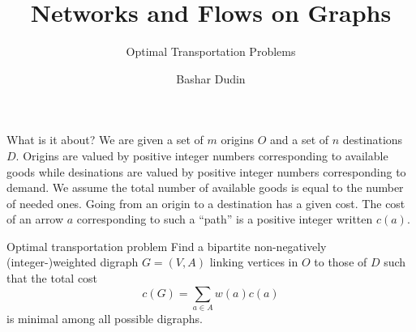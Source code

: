 \documentclass[32pt,aspectratio=169]{beamer}
\author[BD]{Bashar Dudin}
\institute[]{EPITA}
\title{Networks and Flows on Graphs} %
\subtitle{Optimal Transportation Problems}
\begin{document}
\begin{frame}[plain]
\titlepage %
\end{frame}

\begin{frame}{What is it about?}
  We are given a set of $m$ origins $O$ and a set of $n$ destinations
  $D$. \pause Origins are valued by positive integer numbers
  corresponding to available goods while desinations are valued by
  positive integer numbers corresponding to demand. \pause \alert{We
    assume the total number of available goods is equal to the number
    of needed ones.}  \pause Going from an origin to a destination has
  a given cost. The cost of an arrow $a$ corresponding to such a
  ``path'' is a positive integer written $c(a)$. \pause
  \begin{halfshyblock}{Optimal transportation problem}
    Find a bipartite non-negatively (integer-)weighted digraph $G=(V, A)$
    linking vertices in $O$ to those of $D$ such that the total cost
    \begin{displaymath}
      c(G) = \sum_{a \in A}w(a)c(a)
    \end{displaymath}
    is minimal among all possible digraphs. 
  \end{halfshyblock}
\end{frame}
\end{document}
